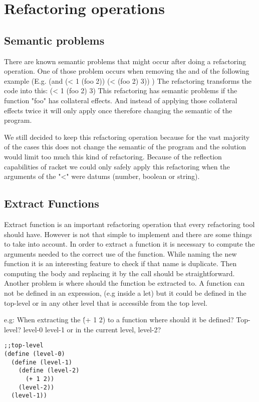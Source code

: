 \section{Refactoring operations}

\subsection{Semantic problems}
There are known semantic problems that might occur after doing a refactoring
operation.
One of those problem occurs when removing the and of the following example
(E.g. (and (< 1 (foo 2)) (< (foo 2) 3)) )
The refactoring transforms the code into this:
(< 1 (foo 2) 3)
This refactoring has semantic problems if the function "foo" has collateral effects.
And instead of applying those collateral effects twice it will only apply once therefore
changing the semantic of the program.

We still decided to keep this refactoring operation because for the vast majority
of the cases this does not change the semantic of the program and the solution
would limit too much this kind of refactoring. Because of the reflection capabilities
of racket we could only safely apply this refactoring when the arguments of the
"<" were datums (number, boolean or string).

\subsection{Extract Functions}
Extract function is an important refactoring operation that every refactoring tool
should have. However is not that simple to implement and there are some things to
take into account.
In order to extract a function it is necessary to compute the arguments needed
to the correct use of the function. While naming the new function it is an interesting
feature to check if that name is duplicate.
Then computing the body and replacing it by the call should be straightforward.
Another problem is where should the function be extracted to. A function can not
be defined in an expression, (e.g inside a let) but it could be defined in the top-level
or in any other level that is accessible from the top level.

e.g: When extracting the \'(+ 1 2) to a function where should it be defined?
Top-level? level-0 level-1 or in the current level, level-2?
\begin{lstlisting}[caption="Example"]
;;top-level
(define (level-0)
  (define (level-1)
    (define (level-2)
      (+ 1 2))
    (level-2))
  (level-1))
\end{lstlisting}


